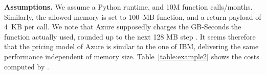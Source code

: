 %
\textbf{Assumptions.} We assume a Python runtime, and 10M function calls/months.
Similarly, the allowed memory is set to 100~\gls{MB} function, and a return payload of 4~KB per call.
We note that Azure supposedly charges the GB-Seconds the function actually used, rounded up to the next 128 \gls{MB} step \cite{AzurePricing}. 
It seems therefore that the pricing model of Azure is similar to the one of \gls{IBM}, delivering the same performance independent of memory size.
Table~\ref{table:example2} shows the costs computed by \sys.
